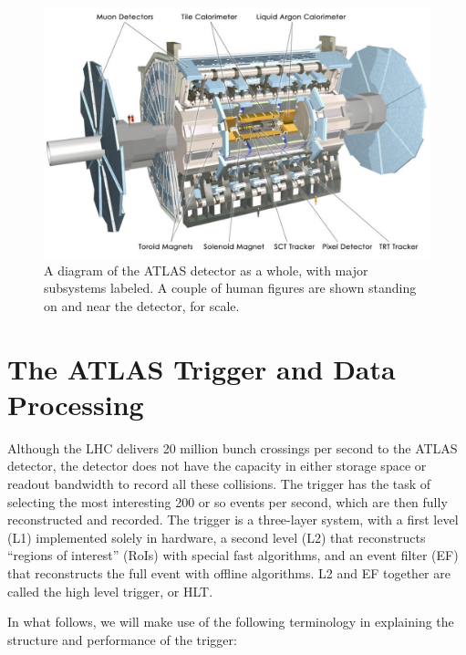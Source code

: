 \begin{figure}
	\includegraphics[width=\textwidth]{ATLASDetector/images/AtlasDetectorLabeled.pdf}	\caption{A diagram of the ATLAS detector as a whole, with major subsystems labeled.  A couple of human figures are shown standing on and near the detector, for scale. \label{fig:detector}}
\end{figure}

\section{The ATLAS Trigger and Data Processing}
\label{sec:atlas_trig}
Although the LHC delivers 20 million bunch crossings per second to the ATLAS detector, the detector does not have the capacity in either storage space or readout bandwidth to record all these collisions.  The trigger has the task of selecting the most interesting 200 or so events per second, which are then fully reconstructed and recorded.  The trigger is a three-layer system, with a first level (L1) implemented solely in hardware, a second level (L2) that reconstructs ``regions of interest'' (RoIs) with special fast algorithms, and an event filter (EF) that reconstructs the full event with offline algorithms.  L2 and EF together are called the high level trigger, or HLT.

In what follows, we will make use of the following terminology in explaining the structure and performance of the trigger:

